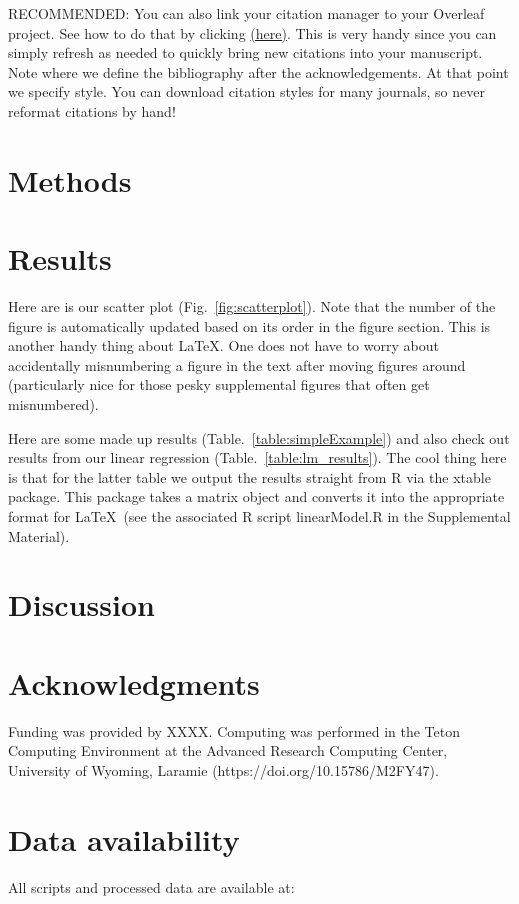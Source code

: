 \documentclass[letterpaper, 12pt]{article}
\begin{document}
\begin{linenumbers}
RECOMMENDED: You can also link your citation manager to your Overleaf project. See how to do that by clicking \href{https://www.overleaf.com/learn/latex/Bibliography_management_with_bibtex}{(here)}. This is very handy since you can simply refresh as needed to quickly bring new citations into your manuscript. Note where we define the bibliography after the acknowledgements. At that point we specify style. You can download citation styles for many journals, so never reformat citations by hand!

\section*{Methods}

\section*{Results}
Here are is our scatter plot (Fig.~\ref{fig:scatterplot}). Note that the number of the figure is automatically updated based on its order in the figure section. This is another handy thing about \LaTeX. One does not have to worry about accidentally misnumbering a figure in the text after moving figures around (particularly nice for those pesky supplemental figures that often get misnumbered).

Here are some made up results (Table.~\ref{table:simpleExample}) and also check out results from our linear regression (Table.~\ref{table:lm_results}). The cool thing here is that for the latter table we output the results straight from R via the xtable package. This package takes a matrix object and converts it into the appropriate format for \LaTeX\ (see the associated R script linearModel.R in the Supplemental Material).

\section*{Discussion}

\section*{Acknowledgments}
Funding was provided by XXXX. Computing was performed in the Teton Computing Environment at the Advanced Research Computing Center, University of Wyoming, Laramie (https://doi.org/10.15786/M2FY47).

\section*{Data availability}
All scripts and processed data are available at:

\end{linenumbers}
\end{document}
